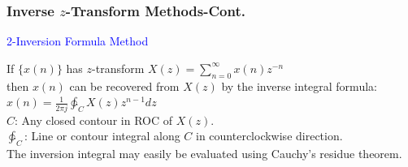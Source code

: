 \documentclass[mathserif, 10pt]{beamer} %
\begin{document}
\frame
{

\normalsize

\frametitle{Inverse $z$-Transform Methods-Cont.}

\textcolor{blue}{2-Inversion Formula Method}

\vspace{.05in}
If $\{ x(n) \}$ has $z$-transform $X(z) = \sum\limits_{n=0}^{\infty} x(n) z^{-n}$ \\ \vspace{.2in}
then $x(n)$ can be recovered from $X(z)$ by the inverse integral formula:\\ \vspace{.2in}
$x(n) = \frac{1}{2 \pi j}  \ointctrclockwise_C X(z) z^{n-1} dz$\\ \vspace{.2in}
$C$: Any closed contour in ROC of $X(z)$.\\ \vspace{.2in}
$\ointctrclockwise_C$: Line or contour integral along $C$ in counterclockwise direction. \\ \vspace{.2in}
The inversion integral may easily be evaluated using Cauchy's residue theorem.\\ %


}
\end{document}
